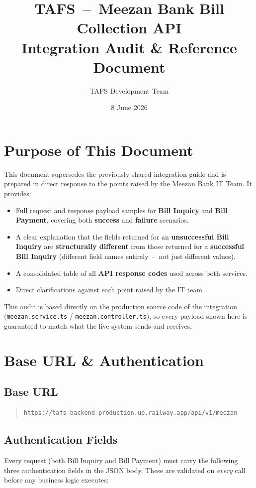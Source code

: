 \documentclass[11pt]{article}
\title{TAFS \,--\, Meezan Bank Bill Collection API \\ Integration Audit \& Reference Document}
\author{TAFS Development Team}
\date{8 June 2026}
\begin{document}
\maketitle

\section*{Purpose of This Document}
This document supersedes the previously shared integration guide and is prepared in direct
response to the points raised by the Meezan Bank IT Team. It provides:
\begin{itemize}
    \item Full request and response payload samples for \textbf{Bill Inquiry} and \textbf{Bill Payment}, covering both \textbf{success} and \textbf{failure} scenarios.
    \item A clear explanation that the fields returned for an \textbf{unsuccessful Bill Inquiry} are \textbf{structurally different} from those returned for a \textbf{successful Bill Inquiry} (different field names entirely \,--\, not just different values).
    \item A consolidated table of all \textbf{API response codes} used across both services.
    \item Direct clarifications against each point raised by the IT team.
\end{itemize}
This audit is based directly on the production source code of the integration
(\texttt{meezan.service.ts} / \texttt{meezan.controller.ts}), so every payload shown here is
guaranteed to match what the live system sends and receives.

\section{Base URL \& Authentication}

\subsection{Base URL}
\begin{quote}
\begin{verbatim}
https://tafs-backend-production.up.railway.app/api/v1/meezan
\end{verbatim}
\end{quote}

\subsection{Authentication Fields}
Every request (both Bill Inquiry and Bill Payment) must carry the following three
authentication fields in the JSON body. These are validated on \emph{every} call before any
business logic executes:
\end{document}
